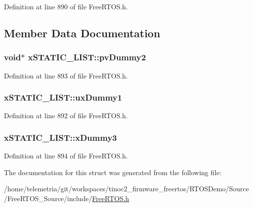 Definition at line 890 of file Free\+R\+T\+O\+S.\+h.



\subsection{Member Data Documentation}
\subsubsection[{\texorpdfstring{pv\+Dummy2}{pvDummy2}}]{\setlength{\rightskip}{0pt plus 5cm}void$\ast$ x\+S\+T\+A\+T\+I\+C\+\_\+\+L\+I\+S\+T\+::pv\+Dummy2}\hypertarget{structx_s_t_a_t_i_c___l_i_s_t_a681e588716be5f49fe8e9eb73e8f280e}{}\label{structx_s_t_a_t_i_c___l_i_s_t_a681e588716be5f49fe8e9eb73e8f280e}


Definition at line 893 of file Free\+R\+T\+O\+S.\+h.

\subsubsection[{\texorpdfstring{ux\+Dummy1}{uxDummy1}}]{ x\+S\+T\+A\+T\+I\+C\+\_\+\+L\+I\+S\+T\+::ux\+Dummy1}\hypertarget{structx_s_t_a_t_i_c___l_i_s_t_a6d7f720dc21e3a676b885b72a945fea7}{}\label{structx_s_t_a_t_i_c___l_i_s_t_a6d7f720dc21e3a676b885b72a945fea7}


Definition at line 892 of file Free\+R\+T\+O\+S.\+h.

\subsubsection[{\texorpdfstring{x\+Dummy3}{xDummy3}}]{ x\+S\+T\+A\+T\+I\+C\+\_\+\+L\+I\+S\+T\+::x\+Dummy3}\hypertarget{structx_s_t_a_t_i_c___l_i_s_t_a232545ebb5629617e0ee6ba286e37788}{}\label{structx_s_t_a_t_i_c___l_i_s_t_a232545ebb5629617e0ee6ba286e37788}


Definition at line 894 of file Free\+R\+T\+O\+S.\+h.



The documentation for this struct was generated from the following file\+:\begin{DoxyCompactItemize}
\item 
/home/telemetria/git/workspaces/tinoc2\+\_\+firmware\+\_\+freertos/\+R\+T\+O\+S\+Demo/\+Source/\+Free\+R\+T\+O\+S\+\_\+\+Source/include/\hyperlink{_free_r_t_o_s_8h}{Free\+R\+T\+O\+S.\+h}\end{DoxyCompactItemize}
